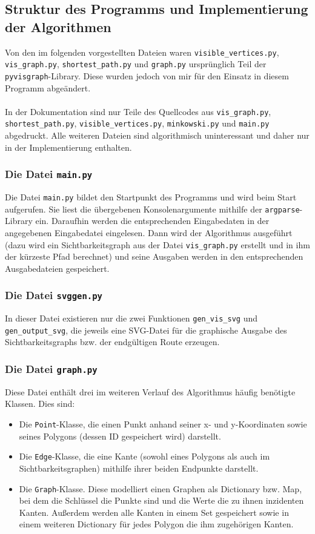 \documentclass[a4paper, notitlepage, 12pt]{scrartcl}
\begin{document}
\subsection{Struktur des Programms und Implementierung der Algorithmen}
Von den im folgenden vorgestellten Dateien waren \texttt{visible\_vertices.py}, \texttt{vis\_graph.py}, \texttt{shortest\_path.py} und \texttt{graph.py} ursprünglich Teil der \texttt{pyvisgraph}-Library. Diese wurden jedoch von mir für den Einsatz in diesem Programm abgeändert. \\ \\
In der Dokumentation sind nur Teile des Quellcodes aus \texttt{vis\_graph.py}, \texttt{shortest\_path.py}, \texttt{visible\_vertices.py}, \texttt{minkowski.py} und \texttt{main.py} abgedruckt. Alle weiteren Dateien sind algorithmisch uninteressant und daher nur in der Implementierung enthalten.
\subsubsection{Die Datei \texttt{main.py}}
Die Datei \texttt{main.py} bildet den Startpunkt des Programms und wird beim Start aufgerufen. Sie liest die übergebenen Konsolenargumente mithilfe der \texttt{argparse}-Library ein. Daraufhin werden die entsprechenden Eingabedaten in der angegebenen Eingabedatei eingelesen. Dann wird der Algorithmus ausgeführt (dazu wird ein Sichtbarkeitsgraph aus der Datei \texttt{vis\_graph.py} erstellt und in ihm der kürzeste Pfad berechnet) und seine Ausgaben werden in den entsprechenden Ausgabedateien gespeichert.
\subsubsection{Die Datei \texttt{svggen.py}}
In dieser Datei existieren nur die zwei Funktionen \texttt{gen\_vis\_svg} und \texttt{gen\_output\_svg}, die jeweils eine SVG-Datei für die graphische Ausgabe des Sichtbarkeitsgraphs bzw. der endgültigen Route erzeugen.
\subsubsection{Die Datei \texttt{graph.py}}
Diese Datei enthält drei im weiteren Verlauf des Algorithmus häufig benötigte Klassen. Dies sind:
\begin{itemize}
	\item Die \texttt{Point}-Klasse, die einen Punkt anhand seiner x- und y-Koordinaten sowie seines Polygons (dessen ID gespeichert wird) darstellt.
	\item Die \texttt{Edge}-Klasse, die eine Kante (sowohl eines Polygons als auch im Sichtbarkeitsgraphen) mithilfe ihrer beiden Endpunkte darstellt.
	\item Die \texttt{Graph}-Klasse. Diese modelliert einen Graphen als Dictionary bzw. Map, bei dem die Schlüssel die Punkte sind und die Werte die zu ihnen inzidenten Kanten. Außerdem werden alle Kanten in einem Set gespeichert sowie in einem weiteren Dictionary für jedes Polygon die ihm zugehörigen Kanten.
\end{itemize}
\end{document}
